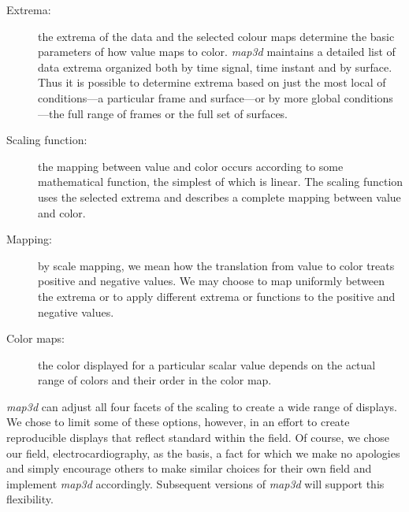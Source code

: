 \documentclass[11pt]{article}
\newcommand{\map}{\emph{map3d}}
\begin{document}
\begin{description}
  \item [Extrema: ] the extrema of the data and the selected colour maps
        determine the basic parameters of how value maps to color.  \map{}
        maintains a detailed list of data extrema organized both by time
        signal, time instant and by surface.  Thus it is possible to determine
        extrema based on just the most local of conditions---a particular
        frame and surface---or by more global conditions---the full range
        of frames or the full set of surfaces.
  \item [Scaling function: ] the mapping between value and color occurs
        according to some mathematical function, the simplest of which
        is linear.   The scaling function uses the selected extrema and
        describes a complete mapping between value and color.
  \item [Mapping: ] by scale mapping, we mean how the translation from
        value to color treats positive and negative values.  We may choose
        to map uniformly between the extrema or to apply different
        extrema or functions to the positive and negative values.
  \item [Color maps: ] the color displayed for a particular scalar value
        depends on the actual range of colors and their order in the color
        map.
\end{description}

\map{} can adjust all four facets of the scaling to create a wide range of
displays.  We chose to limit some of these options, however, in an effort
to create reproducible displays that reflect standard within the field.  Of
course, we chose our field, electrocardiography, as the basis, a fact for
which we make no apologies and simply encourage others to make similar
choices for their own field and implement \map{} accordingly.  Subsequent
versions of \map{} will support this flexibility.
\end{document}
